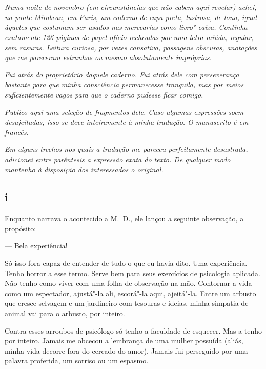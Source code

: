 \chapter*{}

\emph{Numa noite de novembro (em circunstâncias que não cabem aqui
revelar) achei, na ponte Mirabeau, em Paris, um caderno de capa preta,
lustrosa, de lona, igual àqueles que costumam ser usados nas
mercearias como livro"-caixa. Continha exatamente 126 páginas de papel
ofício recheadas por uma letra miúda, regular, sem rasuras. Leitura
curiosa, por vezes cansativa, passagens obscuras, anotações que me
pareceram estranhas ou mesmo absolutamente impróprias.}

\emph{Fui atrás do proprietário daquele caderno. Fui atrás dele com
perseverança bastante para que minha consciência permanecesse tranquila,
mas por meios suficientemente vagos para que o caderno pudesse ficar comigo.}

\emph{Publico aqui uma seleção de fragmentos dele. Caso algumas
expressões soem desajeitadas, isso se deve inteiramente à minha
tradução. O manuscrito é em francês.}

\emph{Em alguns trechos nos quais a tradução me pareceu perfeitamente
desastrada, adicionei entre parêntesis a expressão exata do texto. De
qualquer modo mantenho à disposição dos interessados o original.}

\pagebreak

\section{i}

Enquanto narrava o acontecido a M.~D., ele lançou a seguinte
observação, a propósito:

--- Bela experiência!

Só isso fora capaz de entender de tudo o que eu havia dito. Uma
experiência. Tenho horror a esse termo. Serve bem para seus
exercícios de psicologia aplicada. Não tenho como viver com uma folha de
observação na mão. Contornar a vida como um espectador, ajustá"-la ali,
escorá"-la aqui, ajeitá"-la. Entre um arbusto que cresce selvagem e um
jardineiro com tesouras e ideias, minha simpatia de animal vai para o
arbusto, por inteiro.

Contra esses arroubos de psicólogo só tenho a faculdade de esquecer. Mas
a tenho por inteiro. Jamais me obcecou a lembrança de uma mulher
possuída (aliás, minha vida decorre fora do cercado do amor).
Jamais fui perseguido por uma palavra proferida, um sorriso ou
um espasmo.

